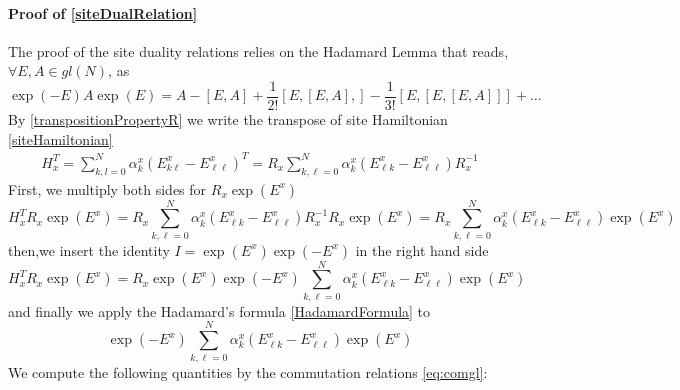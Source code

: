 \documentclass[11pt]{article}
\numberwithin{equation}{section}
\numberwithin{equation}{subsection}
\begin{document}
\paragraph{Proof of \eqref{siteDualRelation}} The proof of the site duality relations relies on the Hadamard Lemma that reads, $\forall E,A \in gl(N)$, as
\begin{equation}\label{HadamardFormula}
    \exp{(-E)}A\exp{(E)}=A-\left[E,A\right]+\frac{1}{2!}\left[E,\left[E,A\right],\right]-\frac{1}{3!}\left[E,\left[E,\left[E,A\right]\right]\right]+\ldots
\end{equation}
 By \eqref{transpositionPropertyR} we write the transpose of site Hamiltonian \eqref{siteHamiltonian} 
\begin{equation}
    \begin{split}
H_{x}^{T}=\sum_{k,l=0}^{N}\alpha_{k}^{x}\left(E_{k\ell}^{x}-E_{\ell\ell}^{x}\right)^{T}=R_{x}\sum_{k,\ell=0}^{N}\alpha_{k}^{x}\left(E_{\ell k}^{x}-E_{\ell\ell}^{x}\right)R_{x}^{-1}
    \end{split}
\end{equation}
First, we multiply both sides for $R_{x}\exp{(E^{x})}$
\begin{equation}
    H_{x}^{T}R_{x}\exp{(E^{x})}=R_{x}\sum_{k,\ell=0}^{N}\alpha_{k}^{x}\left(E_{\ell k}^{x}-E_{\ell\ell}^{x}\right)R_{x}^{-1}R_{x}\exp{(E^{x})}=R_{x}\sum_{k,\ell =0}^{N}\alpha_{k}^{x}\left(E_{\ell k}^{x}-E_{\ell\ell}^{x}\right)\exp{(E^{x})}
\end{equation}
then,we insert the identity $I=\exp{(E^{x})}\exp{(-E^{x})}$ in the right hand side
\begin{equation}\label{intermediateTransposeSite}
H_{x}^{T}R_{x}\exp{(E^{x})}=R_{x}\exp{(E^{x})}\exp{(-E^{x})}\sum_{k,\ell=0}^{N}\alpha_{k}^{x}\left(E_{\ell k}^{x}-E_{\ell\ell}^{x}\right)\exp{(E^{x})}
\end{equation}
and finally we apply the Hadamard's formula \eqref{HadamardFormula} to 
\begin{equation}
    \exp{(-E^{x})}\sum_{k,\ell=0}^{N}\alpha_{k}^{x}\left(E_{\ell k}^{x}-E_{\ell \ell}^{x}\right)\exp{(E^{x})}
\end{equation}
We compute the following quantities by the commutation relations \eqref{eq:comgl}:
\end{document}
